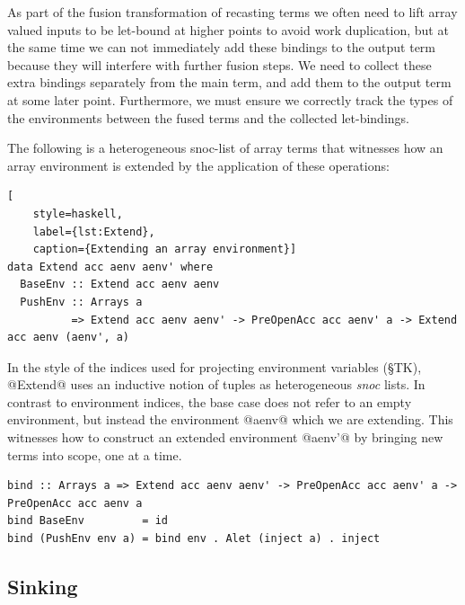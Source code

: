 As part of the fusion transformation of recasting terms we often need to lift
array valued inputs to be let-bound at higher points to avoid work duplication,
but at the same time we can not immediately add these bindings to the output
term because they will interfere with further fusion steps. We need to collect
these extra bindings separately from the main term, and add them to the output
term at some later point. Furthermore, we must ensure we correctly track the
types of the environments between the fused terms and the collected
let-bindings.

The following is a heterogeneous snoc-list of array terms that witnesses how an
array environment is extended by the application of these operations:
%
\begin{lstlisting}[
    style=haskell,
    label={lst:Extend},
    caption={Extending an array environment}]
data Extend acc aenv aenv' where
  BaseEnv :: Extend acc aenv aenv
  PushEnv :: Arrays a
          => Extend acc aenv aenv' -> PreOpenAcc acc aenv' a -> Extend acc aenv (aenv', a)
\end{lstlisting}
%
In the style of the  indices used for projecting environment
variables (\S TK), @Extend@ uses an inductive notion of tuples as
heterogeneous \emph{snoc} lists. In contrast to environment indices, the base
case does not refer to an empty environment, but instead the environment
@aenv@ which we are extending. This witnesses how to construct an extended
environment @aenv'@ by bringing new terms into scope, one at a time.
%
\begin{lstlisting}[style=haskell]
bind :: Arrays a => Extend acc aenv aenv' -> PreOpenAcc acc aenv' a -> PreOpenAcc acc aenv a
bind BaseEnv         = id
bind (PushEnv env a) = bind env . Alet (inject a) . inject
\end{lstlisting}


\subsection{Sinking}
\label{sec:sinking}

